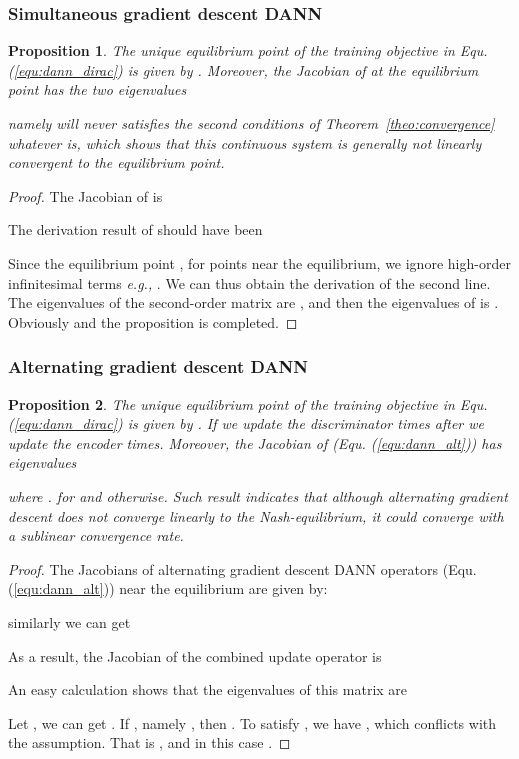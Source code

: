 \documentclass{article} \usepackage{iclr2023_conference,times}
\newtheorem{prop}{Proposition}
\newcommand{\myref}[1]{Equ. (\ref{#1})}
\newcommand{\eg}[0]{\textit{e.g., }}
\begin{document}
\subsubsection{Simultaneous gradient descent DANN}

\begin{prop}
The unique equilibrium point of the training objective in \myref{equ:dann_dirac} is given by . Moreover, the Jacobian of  at the equilibrium point has the two eigenvalues
  
  namely  will never satisfies the second conditions of Theorem~\ref{theo:convergence} whatever  is, which shows that this continuous system is generally not linearly convergent to the equilibrium point.
\label{prop:simdann}
\end{prop}
\begin{proof}
The Jacobian of  is
 
 
The derivation result of  should have been 

Since the equilibrium point , for points near the equilibrium, we ignore high-order infinitesimal terms \eg  . We can thus obtain the derivation of the second line. The eigenvalues of the second-order matrix  
are , and then the eigenvalues of  is . Obviously  and the proposition is completed.
\end{proof}

\subsubsection{Alternating gradient descent DANN}
\begin{prop}
The unique equilibrium point of the training objective in \myref{equ:dann_dirac} is given by . If we update the discriminator  times after we update the encoder  times. Moreover, the Jacobian of  (\myref{equ:dann_alt}) has eigenvalues

where .  for  and  otherwise. Such result indicates that although alternating gradient descent does not converge linearly to the Nash-equilibrium, it could converge with a sublinear convergence rate. 
\label{prop:altdann}
\end{prop}
\begin{proof}
The Jacobians of alternating gradient descent DANN operators (\myref{equ:dann_alt}) near the equilibrium are given by:

similarly we can get 
 
  As a result, the Jacobian of the combined update operator  is
 
An easy calculation shows that the eigenvalues of this matrix are

Let , we can get . If , namely , then . To satisfy , we have , which conflicts with the assumption. That is , and in this case .
\end{proof}
\end{document}
